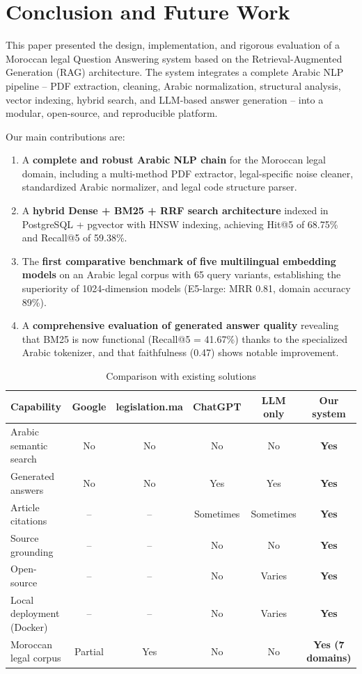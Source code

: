 \section{Conclusion and Future Work}

This paper presented the design, implementation, and rigorous evaluation of
a Moroccan legal Question Answering system based on the Retrieval-Augmented
Generation (RAG) architecture. The system integrates a complete Arabic NLP
pipeline -- PDF extraction, cleaning, Arabic normalization, structural
analysis, vector indexing, hybrid search, and LLM-based answer generation --
into a modular, open-source, and reproducible platform.

Our main contributions are:

\begin{enumerate}
    \item A \textbf{complete and robust Arabic NLP chain} for the Moroccan
    legal domain, including a multi-method PDF extractor, legal-specific
    noise cleaner, standardized Arabic normalizer, and legal code structure
    parser.
    \item A \textbf{hybrid Dense + BM25 + RRF search architecture} indexed
    in PostgreSQL + pgvector with HNSW indexing, achieving Hit@5 of 68.75\%
    and Recall@5 of 59.38\%.
    \item The \textbf{first comparative benchmark of five multilingual
    embedding models} on an Arabic legal corpus with 65 query variants,
    establishing the superiority of 1024-dimension models (E5-large: MRR
    0.81, domain accuracy 89\%).
    \item A \textbf{comprehensive evaluation of generated answer quality}
    revealing that BM25 is now functional (Recall@5 = 41.67\%) thanks to
    the specialized Arabic tokenizer, and that faithfulness (0.47) shows
    notable improvement.
\end{enumerate}

\begin{table}[H]
\centering
\caption{Comparison with existing solutions}
\label{tab:comparison}
\begin{tabular}{lccccc}
\toprule
\textbf{Capability} & \textbf{Google} & \textbf{legislation.ma} & \textbf{ChatGPT} & \textbf{LLM only} & \textbf{Our system} \\
\midrule
Arabic semantic search & No & No & No & No & \textbf{Yes} \\
Generated answers & No & No & Yes & Yes & \textbf{Yes} \\
Article citations & -- & -- & Sometimes & Sometimes & \textbf{Yes} \\
Source grounding & -- & -- & No & No & \textbf{Yes} \\
Open-source & -- & -- & No & Varies & \textbf{Yes} \\
Local deployment (Docker) & -- & -- & No & Varies & \textbf{Yes} \\
Moroccan legal corpus & Partial & Yes & No & No & \textbf{Yes (7 domains)} \\
\bottomrule
\end{tabular}
\end{table}

